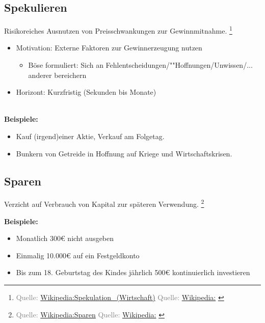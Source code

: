 \documentclass{beamer}
\newcommand{\n}{\hfill\\\vspace{0.25cm}}
\let\oldfootnote\footnote
\renewcommand{\footnote}[1]
{%
	\oldfootnote
	{
		\tiny
		\textcolor{gray}{#1}
	}%
}
\newcommand{\citewiki}[2][]
{%
	\footnote
	{
		\ifthenelse{\isempty{#1}}
		{
			Quelle: \href{https://de.wikipedia.org/wiki/#2}{Wikipedia:#2}
		}
		{
			Quelle: \href{https://de.wikipedia.org/wiki/#2}{Wikipedia:#1}
		}
	}
}
\begin{document}
		\subsection{Spekulieren}
		
			\begin{frame}
				\begin{definition}
					Risikoreiches Ausnutzen von Preisschwankungen zur Gewinnmitnahme.\citewiki{Spekulation\_(Wirtschaft)}
				\end{definition}
				\begin{itemize}
					\item Motivation: Externe Faktoren zur Gewinnerzeugung nutzen
					\begin{itemize}
						\item Böse formuliert: Sich an Fehlentscheidungen/""Hoffnungen/Unwissen/... anderer bereichern
					\end{itemize}
					\item Horizont: Kurzfristig (Sekunden bis Monate)
				\end{itemize}\n
				\textbf{Beispiele:}
				\begin{itemize}
					\item Kauf (irgend)einer Aktie, Verkauf am Folgetag.
					\item Bunkern von Getreide in Hoffnung auf Kriege und Wirtschaftskrisen.
				\end{itemize}
			\end{frame}
		
		\subsection{Sparen}
		
			\begin{frame}
				\begin{definition}
					Verzicht auf Verbrauch von Kapital zur späteren Verwendung.\citewiki{Sparen}
				\end{definition}\hfill
				
				\textbf{Beispiele:}
				\begin{itemize}
					\item Monatlich 300€ nicht ausgeben
					\item Einmalig 10.000€ auf ein Festgeldkonto
					\item Bis zum 18. Geburtstag des Kindes jährlich 500€ kontinuierlich investieren
				\end{itemize}
			\end{frame}
		
\end{document}
